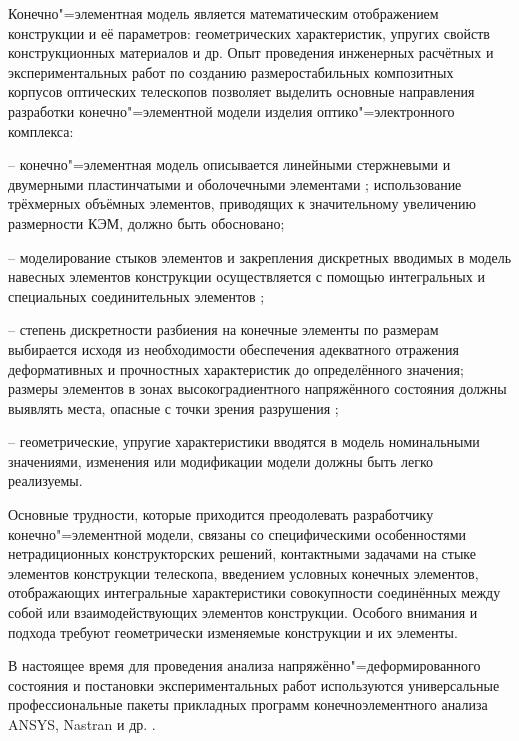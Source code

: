 Конечно"=элементная модель является математическим отображением конструкции и её параметров: геометрических характеристик, упругих свойств конструкционных материалов и др. Опыт проведения инженерных расчётных и экспериментальных работ по созданию размеростабильных композитных корпусов оптических телескопов позволяет выделить основные направления разработки конечно"=элементной модели изделия оптико"=электронного комплекса:



-- конечно"=элементная модель описывается линейными стержневыми и двумерными пластинчатыми и оболочечными элементами \cite{bit:bib17}; использование трёхмерных объёмных элементов, приводящих к значительному увеличению размерности КЭМ, должно быть обосновано;



-- моделирование стыков элементов и закрепления дискретных вводимых в модель навесных элементов конструкции осуществляется с помощью интегральных и специальных соединительных элементов \cite{bit:bib18};



-- степень дискретности разбиения на конечные элементы по размерам выбирается исходя из необходимости обеспечения адекватного отражения деформативных и прочностных характеристик до определённого значения; размеры элементов в зонах высокоградиентного напряжённого состояния должны выявлять места, опасные с точки зрения разрушения \cite{bit:bib19};



-- геометрические, упругие характеристики вводятся в модель номинальными значениями, изменения или модификации модели должны быть легко реализуемы.



Основные трудности, которые приходится преодолевать разработчику конечно"=элементной модели, связаны со специфическими особенностями нетрадиционных конструкторских решений, контактными задачами на стыке элементов конструкции телескопа, введением условных конечных элементов, отображающих интегральные характеристики совокупности соединённых между собой или взаимодействующих элементов конструкции. Особого внимания и подхода требуют геометрически изменяемые конструкции и их элементы.



В настоящее время для проведения анализа напряжённо"=деформированного состояния и постановки экспериментальных работ используются универсальные профессиональные пакеты прикладных программ конечноэлементного анализа ANSYS, Nastran и др. \cite{bit:bib17, bit:bib20, bit:bib21}.



